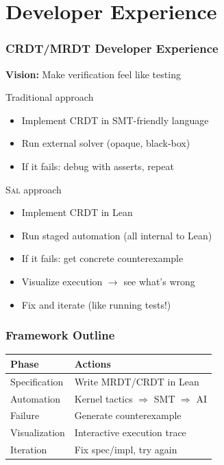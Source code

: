 \documentclass[usepdftitle=false]{beamer}
\newcommand{\sal}{\textsc{Sal}\xspace}
\begin{document}
\section{Developer Experience}

\begin{frame}
  \frametitle{CRDT/MRDT Developer Experience}
  
  \textbf{Vision:} Make verification feel like testing
  
  \begin{block}{Traditional approach}
    \begin{itemize}
      \item Implement CRDT in SMT-friendly language
      \item Run external solver (opaque, black-box)
      \item If it fails: debug with asserts, repeat
    \end{itemize}
  \end{block}
  
  \vspace{0.3cm}
  \begin{block}{\sal approach}
    \begin{itemize}
      \item Implement CRDT in Lean
      \item Run staged automation (all internal to Lean)
      \item If it fails: get concrete counterexample
      \item Visualize execution $\rightarrow$ see what's wrong
      \item Fix and iterate (like running tests!)
    \end{itemize}
  \end{block}
\end{frame}

\begin{frame}
  \frametitle{Framework Outline}
  
  \small
  \centering
  \begin{tabular}{|l|l|}
    \hline
    \textbf{Phase} & \textbf{Actions} \\
    \hline
    Specification & Write MRDT/CRDT in Lean \\
    Automation & Kernel tactics $\Rightarrow$ SMT $\Rightarrow$ AI \\
    Failure & Generate counterexample \\
    Visualization & Interactive execution trace \\
    Iteration & Fix spec/impl, try again \\
    \hline
  \end{tabular}
\end{frame}
\end{document}
